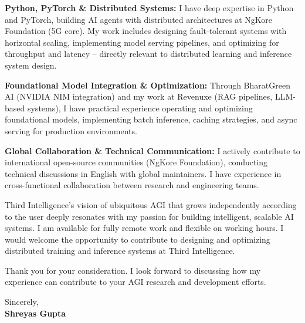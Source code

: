 \documentclass[11pt,letterpaper]{article}
\begin{document}
\vspace{4pt}

\noindent \textbf{Python, PyTorch \& Distributed Systems:} I have deep expertise in Python and PyTorch, building AI agents with distributed architectures at NgKore Foundation (5G core). My work includes designing fault-tolerant systems with horizontal scaling, implementing model serving pipelines, and optimizing for throughput and latency -- directly relevant to distributed learning and inference system design.

\vspace{4pt}

\noindent \textbf{Foundational Model Integration \& Optimization:} Through BharatGreen AI (NVIDIA NIM integration) and my work at Revenuxe (RAG pipelines, LLM-based systems), I have practical experience operating and optimizing foundational models, implementing batch inference, caching strategies, and async serving for production environments.

\vspace{4pt}

\noindent \textbf{Global Collaboration \& Technical Communication:} I actively contribute to international open-source communities (NgKore Foundation), conducting technical discussions in English with global maintainers. I have experience in cross-functional collaboration between research and engineering teams.

\vspace{4pt}

\noindent Third Intelligence's vision of ubiquitous AGI that grows independently according to the user deeply resonates with my passion for building intelligent, scalable AI systems. I am available for fully remote work and flexible on working hours. I would welcome the opportunity to contribute to designing and optimizing distributed training and inference systems at Third Intelligence.

\vspace{4pt}

\noindent Thank you for your consideration. I look forward to discussing how my experience can contribute to your AGI research and development efforts.

\vspace{12pt}

\noindent Sincerely, \\
\vspace{4pt}
\noindent \textbf{Shreyas Gupta}
\end{document}
